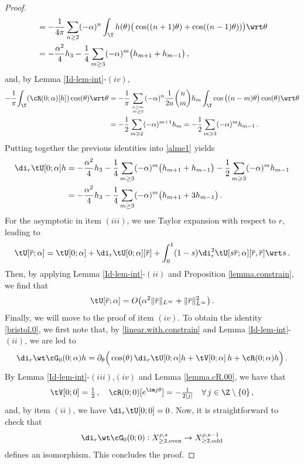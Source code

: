 \documentclass[a4paper,reqno,10pt]{article}
\newcommand{\pa}{\partial}
\begin{document}
\begin{proof}
\begin{align*}
 &=-\frac{1}{4\pi}\sum_{n\geq 2} (-\alpha)^{n}  \int_{\T}h(\theta)\big(\cos((n+1) \theta)+\cos((n-1)\theta)) \big)\wrt \theta\\
 & =-\frac{\alpha^2}{4}h_3  -\frac{1}{4}\sum_{m\geq 3} (-\alpha)^{m}\big(h_{m+1}+h_{m-1}\big)  \,,
\end{align*}
and, by Lemma \ref{Id-lem-int}-$(iv)$,
\begin{align*}
		- \frac{1}{\pi}{\int_{\T}(\cR(0;\alpha)[h] ) \cos(\theta) \wrt \theta}& = -\frac{1}{\pi}\sum_{n\geq m\atop
        m\geq2} (-\alpha)^{n}\frac{1}{2n}\binom{n}{m} h_m \int_{\T}\cos\big((n-m) \theta\big)\cos(\theta)\wrt \theta\\
       &= -\frac{1}{2}\sum_{
        m\geqslant2} (-\alpha)^{m+1} h_m = -\frac{1}{2}\sum_{
        m\geqslant3} (-\alpha)^{m} h_{m-1} \,.
	\end{align*}
    Putting together the previous identities into \ref{alme1} yields
    \begin{align}\label{linera-drU}
		\nonumber\di_{r} \tU[0;\alpha] h &=-\frac{\alpha^2}{4}h_3  -\frac{1}{4}\sum_{m\geq 3} (-\alpha)^{m}\big(h_{m+1}+h_{m-1}\big)-\frac{1}{2}\sum_{
        m\geqslant3} (-\alpha)^{m} h_{m-1}\\
        &=-\frac{\alpha^2}{4}h_3  -\frac{1}{4}\sum_{m\geq 3} (-\alpha)^{m}\big(h_{m+1}+3h_{m-1}\big)\,.
	\end{align}
For the asymptotic in item $(iii)$, we use   Taylor expansion with respect to $r$, leading to
$$
\tU[\overline{r};\alpha]=\tU[0;\alpha]+\di_{r}\tU[0;\alpha][\overline{r}]+\int_0^1(1-s)\di_{r}^2\tU[s\overline{r};\alpha][\overline{r},\overline{r}]\wrt s \,.
$$
Then, by applying  Lemma \ref{Id-lem-int}-$(ii)$ and Proposition \ref{lemma.constrain}, we find that
$$
\tU[\overline{r};\alpha]=O\big(\alpha^2\|\overline{r}\|_{L^\infty}+\|\overline{r}\|_{L^\infty}^2\big) \,.
$$
Finally, we will move to the proof of  item $(iv)$. To obtain the identity  \eqref{bristol.0}, we first note that, by
\eqref{linear.with.constrain} and Lemma \ref{Id-lem-int}-$(ii)$, we are led to
\begin{align*}
	\di_{r} \wt\cG_{0}(0;\alpha) h = \pa_{\theta} \Big(   \cos(\theta) \, \di_{r}\tU[0;\alpha]h  + \tV[0;\alpha]\,h  + \cR(0;\alpha)h \Big) \,.
\end{align*}   
	By Lemma \ref{Id-lem-int}-$(iii)$,$(iv)$ and  Lemma \ref{lemma.cR.00},  we have that
	\begin{equation}
		\tV[0;0] = \tfrac12 \,, \quad \cR(0;0)[e^{\im j \theta}] =- \tfrac{1}{2|j|} \quad \forall\,j\in\Z\setminus\{0\}\,,
	\end{equation}
and, by item $(ii)$, we have $\di_{r}\tU[0;0]=0$. Now, it is straightforward to check that 
$$\di_{r} \wt\cG_{0}(0;0):X_{\geq 2,\rm even}^{\rho,s}\to X_{\geq 2,\rm odd}^{\rho,s-1}$$
defines an isomorphism. This concludes the proof. 
\end{proof}
\end{document}
